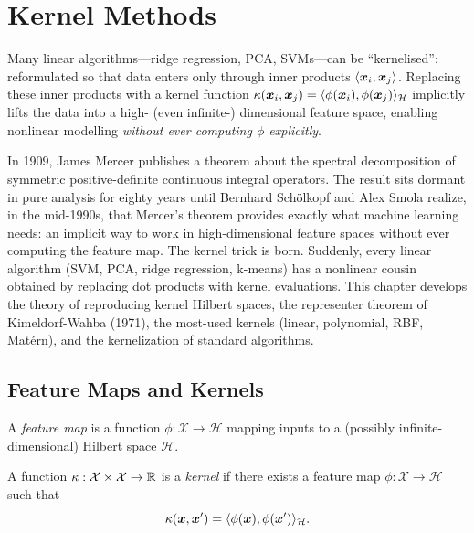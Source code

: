 \chapter{Kernel Methods}
\label{ch:kernels}

\begin{intuition}[title=\textbf{The Kernel Trick}]
Many linear algorithms---ridge regression, PCA, SVMs---can be ``kernelised'': reformulated so that data enters only through inner products $\langle \bm{x}_i, \bm{x}_j \rangle$. Replacing these inner products with a kernel function $\kappa(\bm{x}_i,\bm{x}_j)=\langle \phi(\bm{x}_i), \phi(\bm{x}_j) \rangle_\mathcal{H}$ implicitly lifts the data into a high- (even infinite-) dimensional feature space, enabling nonlinear modelling \emph{without ever computing $\phi$ explicitly}.
\end{intuition}

In 1909, James Mercer publishes a theorem about the spectral decomposition of symmetric positive-definite continuous integral operators. The result sits dormant in pure analysis for eighty years until Bernhard Schölkopf and Alex Smola realize, in the mid-1990s, that Mercer's theorem provides exactly what machine learning needs: an implicit way to work in high-dimensional feature spaces without ever computing the feature map. The kernel trick is born. Suddenly, every linear algorithm (SVM, PCA, ridge regression, k-means) has a nonlinear cousin obtained by replacing dot products with kernel evaluations. This chapter develops the theory of reproducing kernel Hilbert spaces, the representer theorem of Kimeldorf-Wahba (1971), the most-used kernels (linear, polynomial, RBF, Matérn), and the kernelization of standard algorithms.

\section{Feature Maps and Kernels}

\begin{definition}
A \emph{feature map} is a function $\phi:\mathcal{X}\to\mathcal{H}$ mapping inputs to a (possibly infinite-dimensional) Hilbert space $\mathcal{H}$.
\end{definition}

\begin{definition}
A function $\kappa:\mathcal{X}\times\mathcal{X}\to\mathbb{R}$ is a \emph{kernel} if there exists a feature map $\phi:\mathcal{X}\to\mathcal{H}$ such that
\[
  \kappa(\bm{x},\bm{x}') = \langle \phi(\bm{x}), \phi(\bm{x}') \rangle_\mathcal{H}.
\]
\end{definition}


